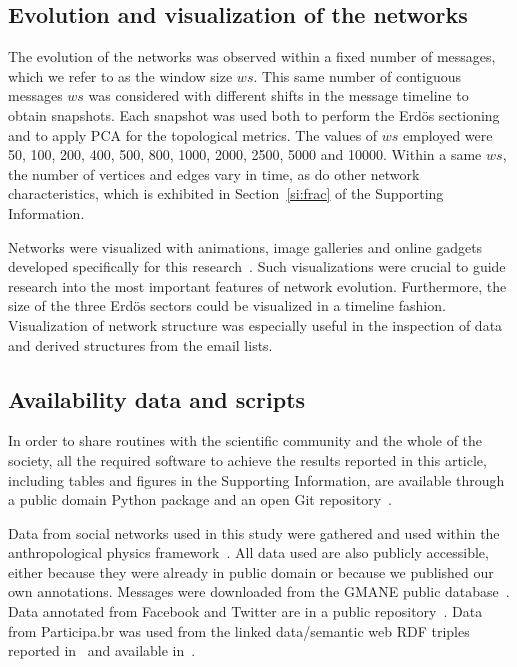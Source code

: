 \documentclass[%
	aip,
	jmp,%
	amsmath,amssymb,
	reprint,%
]{revtex4-1}
\begin{document}
\subsection{Evolution and visualization of the networks}\label{sec:viz}
The evolution of the networks was observed within a fixed number of messages, which we refer to as the window size $ws$. This same number of contiguous messages $ws$ was considered with different shifts in the message timeline to obtain snapshots. Each snapshot was used both to perform the Erd\"os sectioning and to apply PCA for the topological metrics.  
The values of $ws$ employed were 50, 100, 200, 400, 500, 800, 1000, 2000, 2500, 5000 and 10000. Within a same $ws$, the number of vertices and edges vary in time, as do other network characteristics, which is exhibited in Section~\ref{si:frac} of the Supporting Information. 

Networks were visualized with animations, image galleries and online gadgets developed specifically for this research~\cite{animacoes,galGMANE,appGMANE}. Such visualizations were crucial to guide research into the most important features of network evolution. Furthermore, the size of the three Erd\"os sectors could be visualized in a timeline fashion. Visualization of network structure was especially useful in the inspection of data and derived structures from the email lists.

\subsection{Availability data and scripts}\label{scripts}
In order to share routines with the scientific community and the whole of the society,
all the required software to achieve the results reported in this article,
including tables and figures in the Supporting Information,
are available through a public domain Python package and an open Git repository~\cite{gmanePack}.

Data from social networks used in this study were gathered and used within the anthropological physics framework~\cite{anPhy}.
All data used are also publicly accessible, either because they were already in public domain or because
we published our own annotations.
Messages were downloaded from the GMANE public database~\cite{GMANEwikipedia}.
Data annotated from Facebook and Twitter are in a public repository~\cite{fbtwData}.
Data from Participa.br was used from the linked data/semantic web RDF triples
reported in~\cite{opa} and available in~\cite{datahub}.
\end{document}
